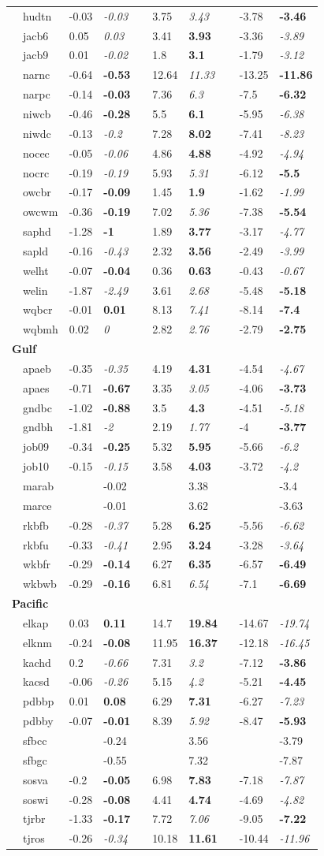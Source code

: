 \documentclass[10pt,letterpaper]{article}\usepackage[]{graphicx}\usepackage[]{color}
\begin{document}
\begin{table}[!tbp]
{\begin{center}
\begin{tabular}{lllcllcll}
~~hudtn&-0.03&{\it -0.03}&&3.75&{\it 3.43}&&-3.78&{\bf -3.46}\tabularnewline
~~jacb6&0.05&{\it 0.03}&&3.41&{\bf 3.93}&&-3.36&{\it -3.89}\tabularnewline
~~jacb9&0.01&{\it -0.02}&&1.8&{\bf 3.1}&&-1.79&{\it -3.12}\tabularnewline
~~narnc&-0.64&{\bf -0.53}&&12.64&{\it 11.33}&&-13.25&{\bf -11.86}\tabularnewline
~~narpc&-0.14&{\bf -0.03}&&7.36&{\it 6.3}&&-7.5&{\bf -6.32}\tabularnewline
~~niwcb&-0.46&{\bf -0.28}&&5.5&{\bf 6.1}&&-5.95&{\it -6.38}\tabularnewline
~~niwdc&-0.13&{\it -0.2}&&7.28&{\bf 8.02}&&-7.41&{\it -8.23}\tabularnewline
~~nocec&-0.05&{\it -0.06}&&4.86&{\bf 4.88}&&-4.92&{\it -4.94}\tabularnewline
~~nocrc&-0.19&{\it -0.19}&&5.93&{\it 5.31}&&-6.12&{\bf -5.5}\tabularnewline
~~owcbr&-0.17&{\bf -0.09}&&1.45&{\bf 1.9}&&-1.62&{\it -1.99}\tabularnewline
~~owcwm&-0.36&{\bf -0.19}&&7.02&{\it 5.36}&&-7.38&{\bf -5.54}\tabularnewline
~~saphd&-1.28&{\bf -1}&&1.89&{\bf 3.77}&&-3.17&{\it -4.77}\tabularnewline
~~sapld&-0.16&{\it -0.43}&&2.32&{\bf 3.56}&&-2.49&{\it -3.99}\tabularnewline
~~welht&-0.07&{\bf -0.04}&&0.36&{\bf 0.63}&&-0.43&{\it -0.67}\tabularnewline
~~welin&-1.87&{\it -2.49}&&3.61&{\it 2.68}&&-5.48&{\bf -5.18}\tabularnewline
~~wqbcr&-0.01&{\bf 0.01}&&8.13&{\it 7.41}&&-8.14&{\bf -7.4}\tabularnewline
~~wqbmh&0.02&{\it 0}&&2.82&{\it 2.76}&&-2.79&{\bf -2.75}\tabularnewline
\hline
{\bfseries Gulf}&&&&&&&&\tabularnewline
~~apaeb&-0.35&{\it -0.35}&&4.19&{\bf 4.31}&&-4.54&{\it -4.67}\tabularnewline
~~apaes&-0.71&{\bf -0.67}&&3.35&{\it 3.05}&&-4.06&{\bf -3.73}\tabularnewline
~~gndbc&-1.02&{\bf -0.88}&&3.5&{\bf 4.3}&&-4.51&{\it -5.18}\tabularnewline
~~gndbh&-1.81&{\it -2}&&2.19&{\it 1.77}&&-4&{\bf -3.77}\tabularnewline
~~job09&-0.34&{\bf -0.25}&&5.32&{\bf 5.95}&&-5.66&{\it -6.2}\tabularnewline
~~job10&-0.15&{\it -0.15}&&3.58&{\bf 4.03}&&-3.72&{\it -4.2}\tabularnewline
~~marab&&-0.02&&&3.38&&&-3.4\tabularnewline
~~marce&&-0.01&&&3.62&&&-3.63\tabularnewline
~~rkbfb&-0.28&{\it -0.37}&&5.28&{\bf 6.25}&&-5.56&{\it -6.62}\tabularnewline
~~rkbfu&-0.33&{\it -0.41}&&2.95&{\bf 3.24}&&-3.28&{\it -3.64}\tabularnewline
~~wkbfr&-0.29&{\bf -0.14}&&6.27&{\bf 6.35}&&-6.57&{\bf -6.49}\tabularnewline
~~wkbwb&-0.29&{\bf -0.16}&&6.81&{\it 6.54}&&-7.1&{\bf -6.69}\tabularnewline
\hline
{\bfseries Pacific}&&&&&&&&\tabularnewline
~~elkap&0.03&{\bf 0.11}&&14.7&{\bf 19.84}&&-14.67&{\it -19.74}\tabularnewline
~~elknm&-0.24&{\bf -0.08}&&11.95&{\bf 16.37}&&-12.18&{\it -16.45}\tabularnewline
~~kachd&0.2&{\it -0.66}&&7.31&{\it 3.2}&&-7.12&{\bf -3.86}\tabularnewline
~~kacsd&-0.06&{\it -0.26}&&5.15&{\it 4.2}&&-5.21&{\bf -4.45}\tabularnewline
~~pdbbp&0.01&{\bf 0.08}&&6.29&{\bf 7.31}&&-6.27&{\it -7.23}\tabularnewline
~~pdbby&-0.07&{\bf -0.01}&&8.39&{\it 5.92}&&-8.47&{\bf -5.93}\tabularnewline
~~sfbcc&&-0.24&&&3.56&&&-3.79\tabularnewline
~~sfbgc&&-0.55&&&7.32&&&-7.87\tabularnewline
~~sosva&-0.2&{\bf -0.05}&&6.98&{\bf 7.83}&&-7.18&{\it -7.87}\tabularnewline
~~soswi&-0.28&{\bf -0.08}&&4.41&{\bf 4.74}&&-4.69&{\it -4.82}\tabularnewline
~~tjrbr&-1.33&{\bf -0.17}&&7.72&{\it 7.06}&&-9.05&{\bf -7.22}\tabularnewline
~~tjros&-0.26&{\it -0.34}&&10.18&{\bf 11.61}&&-10.44&{\it -11.96}\tabularnewline
\hline
\end{tabular}\end{center}}


\end{table}
\end{document}
